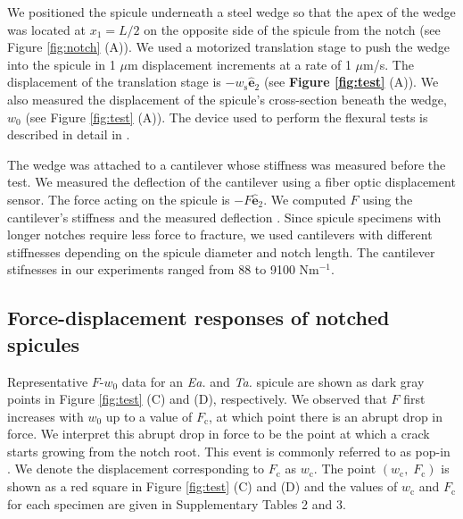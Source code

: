 \documentclass[12pt,onecolumn]{article}
\makeatletter
\newcommand{\ey}{\hat{\mathbf{e}}_2}
\newcommand{\TA}{\textit{Ta.\@}\xspace}
\newcommand{\EA}{\textit{Ea.\@}\xspace}
\makeatother
\begin{document}
We positioned the spicule underneath a steel wedge so that the apex of the wedge was located at $x_1=L/2$ on the opposite side of the spicule from the notch (see Figure \ref{fig:notch} (A)). We used a motorized translation stage to push the wedge into the spicule in 1 $\mu$m displacement increments at a rate of 1 $\mu$m/s. The displacement of the translation stage is $-w_\mathrm{s}\ey$ (see {\bf Figure \ref{fig:test}} (A)). We also measured the displacement of the spicule's cross-section beneath the wedge, $w_0$ (see Figure \ref{fig:test} (A)). The device used to perform the flexural tests is described in detail in \cite{monn2017enhanced,monn2017millimeter}.

The wedge was attached to a cantilever whose stiffness was measured before the test. We measured the deflection of the cantilever using a fiber optic displacement sensor. The force acting on the spicule is $-F\ey$. We computed $F$ using the cantilever's stiffness and the measured deflection \cite{monn2017enhanced}. Since spicule specimens with longer notches require less force to fracture, we used cantilevers with different stiffnesses depending on the spicule diameter and notch length. The cantilever stifnesses in our experiments ranged from 88 to 9100 Nm$^{-1}$.


\subsection*{Force-displacement responses of notched spicules}
\label{sec:fdresp}
Representative $F$-$w_0$ data for an \EA and \TA spicule are shown as dark gray points in Figure \ref{fig:test} (C) and (D), respectively. We observed that $F$ first increases with $w_0$ up to a value of $F_\mathrm{c}$, at which point there is an abrupt drop in force. We interpret this abrupt drop in force to be the point at which a crack starts growing from the notch root. This event is commonly referred to as pop-in \cite{paris1965fracture,jaya2014crack}. We denote the displacement corresponding to $F_\mathrm{c}$ as $w_\mathrm{c}$. The point $(w_\mathrm{c}, \; F_\mathrm{c})$ is shown as a red square in Figure \ref{fig:test} (C) and (D) and the values of $w_\mathrm{c}$ and $F_\mathrm{c}$ for each specimen are given in Supplementary Tables 2 and 3. 
\end{document}
